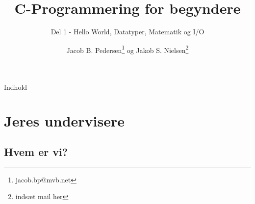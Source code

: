 \documentclass{beamer}
\title{C-Programmering for begyndere}
\subtitle{Del 1 - Hello World, Datatyper, Matematik og I/O}
\author{Jacob B. Pedersen\footnote{jacob.bp@mvb.net} og Jakob S. Nielsen\footnote{indsæt mail her}}
\begin{document}
\begin{frame}
	\maketitle
\end{frame}

\begin{frame}{Indhold}
	\tableofcontents
\end{frame}

\section{Jeres undervisere}
\subsection{Hvem er vi?}
\end{document}
